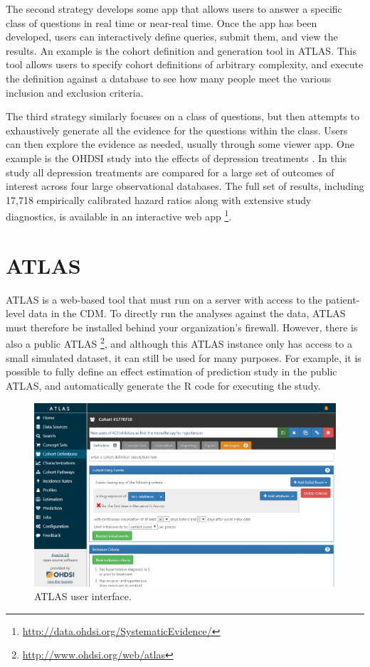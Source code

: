 \documentclass[11pt]{book}
\let\rmarkdownfootnote\footnote%
\def\footnote{\protect\rmarkdownfootnote}
\theoremstyle{definition}
\theoremstyle{definition}
\theoremstyle{definition}
\theoremstyle{remark}
\begin{document}
The second strategy develops some app that allows users to answer a specific class of questions in real time or near-real time. Once the app has been developed, users can interactively define queries, submit them, and view the results. An example is the cohort definition and generation tool in ATLAS. This tool allows users to specify cohort definitions of arbitrary complexity, and execute the definition against a database to see how many people meet the various inclusion and exclusion criteria.

The third strategy similarly focuses on a class of questions, but then attempts to exhaustively generate all the evidence for the questions within the class. Users can then explore the evidence as needed, usually through some viewer app. One example is the OHDSI study into the effects of depression treatments \citep{schuemie_2018b}. In this study all depression treatments are compared for a large set of outcomes of interest across four large observational databases. The full set of results, including 17,718 empirically calibrated hazard ratios along with extensive study diagnostics, is available in an interactive web app \footnote{\url{http://data.ohdsi.org/SystematicEvidence/}}.

\hypertarget{atlas}{%
\section{ATLAS}\label{atlas}}

ATLAS is a web-based tool that must run on a server with access to the patient-level data in the CDM. To directly run the analyses against the data, ATLAS must therefore be installed behind your organization's firewall. However, there is also a public ATLAS \footnote{\url{http://www.ohdsi.org/web/atlas}}, and although this ATLAS instance only has access to a small simulated dataset, it can still be used for many purposes. For example, it is possible to fully define an effect estimation of prediction study in the public ATLAS, and automatically generate the R code for executing the study.

\begin{figure}

{\centering \includegraphics[width=1\linewidth]{images/OhdsiAnalyticsTools/atlas} 

}

\caption{ATLAS user interface.}\label{fig:atlas}
\end{figure}
\end{document}
